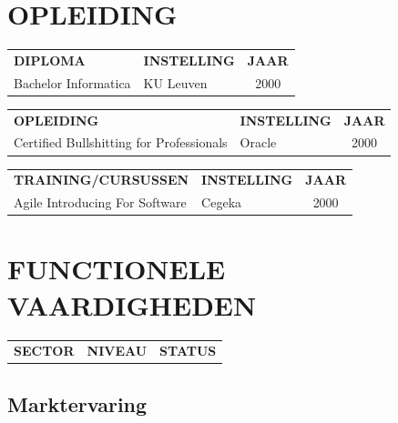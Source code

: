 \documentclass{article}
\begin{document}
\section*{OPLEIDING}

\begin{tabularx}{\textwidth}{X|l|c}
	\rowcolor{cegekagreen}
	{\bfseries \leavevmode\color{white} DIPLOMA} 		& {\bfseries \color{white} INSTELLING} 	& {\bfseries \color{white} JAAR} \\
	Bachelor Informatica 								& KU Leuven 							& 2000 \\
	\hline
\end{tabularx}

\vspace*{1 cm}

\begin{tabularx}{\textwidth}{X!{\color{darkgray}\vrule}l!{\color{darkgray}\vrule}c}
	{\bfseries \leavevmode\color{white} OPLEIDING} 		& {\bfseries \color{white} INSTELLING} 	& {\bfseries \color{white} JAAR} \\
	Certified Bullshitting for Professionals			& Oracle 								& 2000 \\
	\hline
\end{tabularx}

\vspace*{1 cm}

\begin{tabularx}{\textwidth}{X|l|c}
	\rowcolor{cegekagreen}
	{\bfseries \leavevmode\color{white} TRAINING/CURSUSSEN} 		& {\bfseries \color{white} INSTELLING} 	& {\bfseries \color{white} JAAR} \\
	Agile Introducing For Software									& Cegeka 								& 2000 \\
	\hline
\end{tabularx}

\section*{FUNCTIONELE VAARDIGHEDEN}

\begin{tabularx}{\textwidth}{X|L{2cm}|L{2cm}}
	{\bfseries \leavevmode\color{white} SECTOR} & {\bfseries \color{white} NIVEAU}	& {\bfseries \color{white} STATUS}
\end{tabularx}

\subsection*{Marktervaring}
\end{document}

